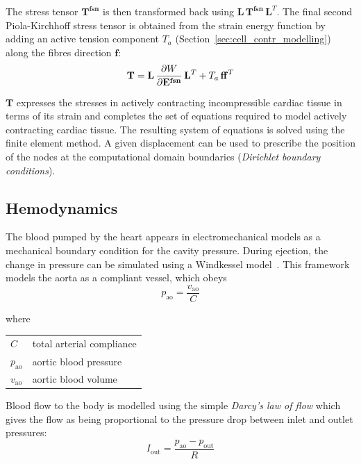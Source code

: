 \noindent
The stress tensor $\mathbf{T^{fsn}}$ is then transformed back using $\mathbf{L}\,\mathbf{T^{fsn}}\,\mathbf{L}^T$. The final second Piola-Kirchhoff stress tensor is obtained from the strain energy function by adding an active tension component $T_a$ (Section~\ref{sec:cell_contr_modelling}) along the fibres direction $\mathbf{f}$:
%
\begin{equation}\label{eq:eqce}
    \mathbf{T} = \mathbf{L}\,\dfrac{\partial {W}}{\partial {\mathbf{E^{fsn}}}}\,\mathbf{L}^T + T_a\,\mathbf{ff}^T
\end{equation}

\noindent
$\mathbf{T}$ expresses the stresses in actively contracting incompressible cardiac tissue in terms of its strain and completes the set of equations required to model actively contracting cardiac tissue. The resulting system of equations is solved using the finite element method. A given displacement can be used to prescribe the position of the nodes at the computational domain boundaries (\textit{Dirichlet boundary conditions}).


%
%
%
\subsection{Hemodynamics}\label{sec:hemodynamics_math_modelling}
The blood pumped by the heart appears in electromechanical models as a mechanical boundary condition for the cavity pressure. During ejection, the change in pressure can be simulated using a Windkessel model~\cite{Westerhof:1971}. This framework models the aorta as a compliant vessel, which obeys
%
\begin{equation}\label{eq:firstwkelem}
    p_{\textrm{ao}} = \frac{v_{\textrm{ao}}}{C}
\end{equation}

\noindent
where

\vspace{0.2cm}
\begin{tabular}{ll}
    $C$ & total arterial compliance \\
    $p_{\textrm{ao}}$ & aortic blood pressure \\
    $v_{\textrm{ao}}$ & aortic blood volume \\
\end{tabular}

\vspace{0.5cm}
\noindent
Blood flow to the body is modelled using the simple \textit{Darcy's law of flow} which gives the flow as being proportional to the pressure drop between inlet and outlet pressures:
%
\begin{equation}\label{eq:secondwkelem}
    I_{\textrm{out}} = \frac{p_{\textrm{ao}}-p_{\textrm{out}}}{R} 
\end{equation}

